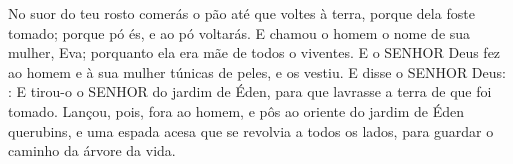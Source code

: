 {{  No suor do teu rosto comerás o pão até que voltes à terra, porque dela foste tomado; porque pó és, e ao pó voltarás}.
  E chamou o homem o nome de sua mulher, Eva; porquanto ela era mãe de todos o viventes.
  E o SENHOR Deus fez ao homem e à sua mulher túnicas de peles, e os vestiu.
  E disse o SENHOR Deus: : %
  E tirou-o o SENHOR do jardim de Éden, para que lavrasse a terra de que foi tomado.
  Lançou, pois, fora ao homem, e pôs ao oriente do jardim de Éden querubins, e uma espada acesa que se revolvia a todos os lados, para guardar o caminho da árvore da vida.
 \par }

